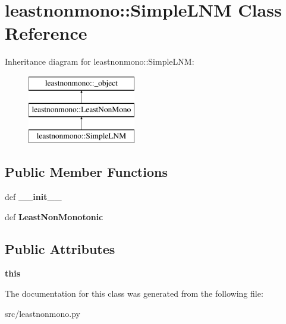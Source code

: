 \hypertarget{classleastnonmono_1_1SimpleLNM}{
\section{leastnonmono::SimpleLNM Class Reference}
\label{d8/df0/classleastnonmono_1_1SimpleLNM}
}
Inheritance diagram for leastnonmono::SimpleLNM:\begin{figure}[H]
\begin{center}
\leavevmode
\includegraphics[height=3cm]{d8/df0/classleastnonmono_1_1SimpleLNM}
\end{center}
\end{figure}
\subsection*{Public Member Functions}
\begin{DoxyCompactItemize}
\item 
\hypertarget{classleastnonmono_1_1SimpleLNM_a60b4300be3d34df4505fa4a58eb214dd}{
def {\bfseries \_\-\_\-init\_\-\_\-}}
\label{d8/df0/classleastnonmono_1_1SimpleLNM_a60b4300be3d34df4505fa4a58eb214dd}

\item 
\hypertarget{classleastnonmono_1_1SimpleLNM_ac5c0bed3e296b52b508ad9f45860ac75}{
def {\bfseries LeastNonMonotonic}}
\label{d8/df0/classleastnonmono_1_1SimpleLNM_ac5c0bed3e296b52b508ad9f45860ac75}

\end{DoxyCompactItemize}
\subsection*{Public Attributes}
\begin{DoxyCompactItemize}
\item 
\hypertarget{classleastnonmono_1_1SimpleLNM_a0e7014df02df6a20c4a5d1a78e574303}{
{\bfseries this}}
\label{d8/df0/classleastnonmono_1_1SimpleLNM_a0e7014df02df6a20c4a5d1a78e574303}

\end{DoxyCompactItemize}


The documentation for this class was generated from the following file:\begin{DoxyCompactItemize}
\item 
src/leastnonmono.py\end{DoxyCompactItemize}
